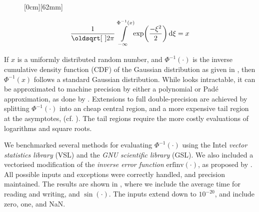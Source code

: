\documentclass[a0paper,portrait,fontscale=0.40]{baposter}
\begin{document}
\begin{poster}
{  	  	\begin{wrapfigure}{l}{0.35\linewidth}\centering
  	  		\raisebox{10mm}[0cm][62mm]{
  	  			\begin{minipage}[t]{0.99\linewidth}
			\begin{equation}
  	  		\label{eqt:def:inverse_cdf_gaussian}
  	  		\dfrac{1}{\sqrt{2\pi}}\! \int\displaylimits_{-\infty}^{\Phi^{-1}(x)}\! \exp(\dfrac{-\xi^2}{2}) \dd{\xi} = x
  	  		\end{equation}
  	  		\centering
  	  		\label{fig:inverse_cdf_function}
  	  			\end{minipage}
  	  		} 
  	  	\end{wrapfigure}
  	  	If $ x $ is a uniformly distributed random number, and $ \Phi^{-1}(\cdot) $ is the inverse cumulative density function (CDF) of the Gaussian distribution as given in , then $ \Phi^{-1}(x) $ follows a standard Gaussian distribution.   	  	
  	  	While  looks intractable, it can be approximated to machine precision by either a polynomial or Pad\'{e} approximation, as done by \citet{evans1974algorithm70}. Extensions to full double-precision \citep{beasley1985percentage,wichura1988algorithm,marsaglia1994rapid}  are achieved by splitting $ \Phi^{-1}(\cdot) $ into an cheap central region, and a more expensive tail region at the asymptotes, (cf. ). The tail regions require the more costly evaluations of logarithms and square roots.
  	  	
  	  	We benchmarked several methods for evaluating  $ \Phi^{-1}(\cdot) $  using the Intel \textit{vector statistics library} (VSL) and the \textit{GNU  scientific library} (GSL). We also included a vectorised modification of the \textit{inverse error function} $ \textrm{erfinv}(\cdot) $, as proposed by \citet{giles2011approximating}. All possible inputs and exceptions were correctly handled, and precision maintained. The results are shown in , where we include the average time for reading and writing, and $ \sin(\cdot) $. The inputs extend down to $ 10^{-20} $, and include zero, one, and NaN. 
			\begin{Figure}
				\centering
				\label{fig:inverse_cdf_performance}
			\end{Figure}


}
\end{poster}
\end{document}
